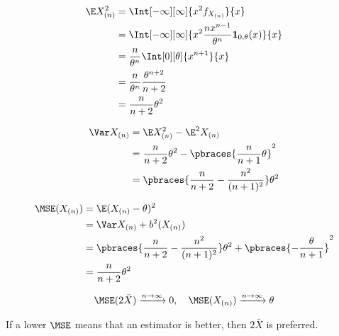 \begin{solution}
\begin{enumerate}[label = (\alph*)]
\begin{enumerate}[label = \arabic*.]
        \begin{align*}
            \E X_{(n)}^2
            & =
            \Int[-\infty][\infty]
            {
                x^2 f_{X_{(n)}}
            }{x} \\
            & =
            \Int[-\infty][\infty]
            {
                x^2 \frac{n x^{n-1}}{\theta^n} \mathbf 1_{0, \theta}(x)
            }{x} \\
            & =
            \frac{n}{\theta^n}
            \Int[0][\theta]
            {
                x^{n+1}
            }{x} \\
            & =
            \frac{n}{\theta^n}
            \frac{\theta^{n+2}}{n+2} \\
            & =
            \frac{n}{n+2} \theta^2
        \end{align*}

        \begin{align*}
            \Var X_{(n)}
            & =
            \E X_{(n)}^2 - \E^2 X_{(n)} \\
            & =
            \frac{n}{n+2} \theta^2 - \pbraces{\frac{n}{n+1} \theta}^2 \\
            & =
            \pbraces
            {
                \frac{n}{n+2} - \frac{n^2}{(n+1)^2}
            }
            \theta^2
        \end{align*}

        \begin{align*}
            \MSE(X_{(n)})
            & =
            \E (X_{(n)} - \theta)^2 \\
            & =
            \Var X_{(n)} + b^2(X_{(n)}) \\
            & =
            \pbraces
            {
                \frac{n}{n+2} - \frac{n^2}{(n+1)^2}
            }
            \theta^2
            +
            \pbraces
            {
                -\frac{\theta}{n+1}
            }^2 \\
            & =
            \frac{n}{n+2} \theta^2
        \end{align*}

        \begin{align*}
            \MSE(2 \bar X) \xrightarrow{n \to \infty} 0,
            \quad
            \MSE(X_{(n)}) \xrightarrow{n \to \infty} \theta
        \end{align*}

        If a lower $\MSE$ means that an estimator is better, then $2 \bar X$ is preferred.

    \end{enumerate}

\end{enumerate}

\end{solution}

